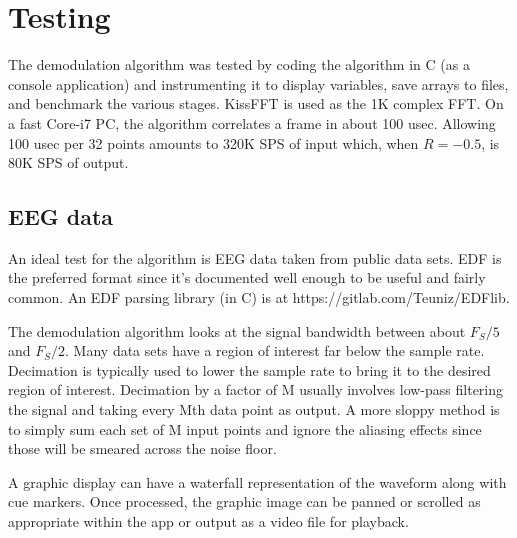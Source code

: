 \section{Testing}

The demodulation algorithm was tested by coding the algorithm in C (as a console
application) and instrumenting it to display variables,
save arrays to files, and benchmark the various stages.
KissFFT is used as the 1K complex FFT.
On a fast Core-i7 PC, the algorithm correlates a frame in about 100 usec.
Allowing 100 usec per 32 points amounts to 320K SPS of input which, when $R=-0.5$,
is 80K SPS of output.

\subsection{EEG data}

An ideal test for the algorithm is EEG data taken from public data sets.
EDF is the preferred format since it's documented well enough to be useful
and fairly common. 
An EDF parsing library (in C) is at https://gitlab.com/Teuniz/EDFlib.

The demodulation algorithm looks at the signal bandwidth between about
$F_S/5$ and $F_S/2$.
Many data sets have a region of interest far below the sample rate.
Decimation is typically used to lower the sample rate to bring it to the
desired region of interest. 
Decimation by a factor of M usually involves low-pass filtering the signal
and taking every Mth data point as output.
A more sloppy method is to simply sum each set of M input points and ignore
the aliasing effects since those will be smeared across the noise floor.

A graphic display can have a waterfall representation of the waveform along
with cue markers. Once processed, the graphic image can be panned or scrolled
as appropriate within the app or output as a video file for playback.


